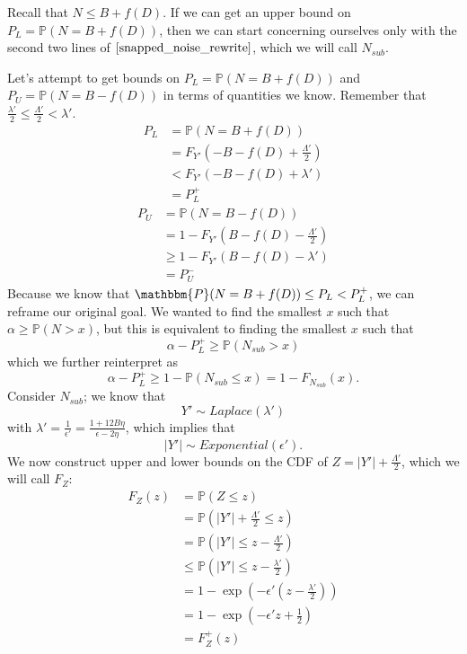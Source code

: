 \documentclass[11pt]{scrartcl} %
\begin{document}
Recall that $N \leq B + f(D)$. If we can get an upper bound on $P_{L} = \mathbb{P}(N = B + f(D))$, then we can start concerning ourselves only with the second two lines of $\eqref{snapped_noise_rewrite}$, which we will call $N_{sub}$. \newline

Let's attempt to get bounds on $P_{L} = \mathbb{P}(N = B + f(D))$ and $P_{U} = \mathbb{P}(N = B - f(D))$ in terms of quantities we know. Remember that $\frac{\lambda'}{2} \leq \frac{\Lambda'}{2} < \lambda'$.
\begin{align}
	P_{L} &= \mathbb{P}(N = B + f(D)) \nonumber \\
		  &= F_{Y'}(-B - f(D) + \frac{\Lambda'}{2}) \nonumber \\
		  &< F_{Y'}(-B - f(D) + \lambda') \nonumber \\
		  &= P_{L}^{+} \nonumber
\end{align}
\begin{align}
	P_{U} &= \mathbb{P}(N = B - f(D)) \nonumber \\
		  &= 1 - F_{Y'}(B - f(D) - \frac{\Lambda'}{2}) \nonumber \\
		  &\geq 1 - F_{Y'}(B - f(D) - \lambda') \nonumber \\
		  &= P_{U}^{-} \nonumber
\end{align}
Because we know that $\mathbbm{P}(N=B+f(D)) \leq P_L < P_{L}^{+}$, we can reframe our original goal. We wanted to find the smallest $x$ such that $\alpha \geq \mathbb{P}(N > x)$, but this is equivalent to finding the smallest $x$ such that
\[ \alpha - P_{L}^{+} \geq \mathbb{P}(N_{sub} > x) \]
which we further reinterpret as
\[ \alpha - P_{L}^{+} \geq 1 - \mathbb{P}(N_{sub} \leq x) = 1 - F_{N_{sub}}(x). \]
Consider $N_{sub}$; we know that
\[ Y' \sim Laplace (\lambda') \]
with $\lambda' = \frac{1}{\epsilon'} = \frac{1 + 12B \eta}{\epsilon - 2 \eta}$, which implies that
\[ \vert Y' \vert \sim Exponential(\epsilon'). \]
We now construct upper and lower bounds on the CDF of $Z = \vert Y' \vert + \frac{\Lambda'}{2}$, which we will call $F_{Z}$:
\begin{align}
	F_{Z}(z) &= \mathbb{P}(Z \leq z) \nonumber \\
			 &= \mathbb{P}\left( \vert Y' \vert + \frac{\Lambda'}{2} \leq z \right) \nonumber \\
			 &= \mathbb{P} \left( \vert Y' \vert \leq z - \frac{\Lambda'}{2} \right) \nonumber \\
			 &\leq \mathbb{P} \left( \vert Y' \vert \leq z - \frac{\lambda'}{2} \right) \nonumber \\
			 &= 1 - \exp\left( -\epsilon'(z - \frac{\lambda'}{2}) \right) \nonumber \\
			 &= 1 - \exp\left( -\epsilon'z + \frac{1}{2} \right) \nonumber \\
			 &= F_{Z}^{+}(z) \nonumber
\end{align}
\end{document}
